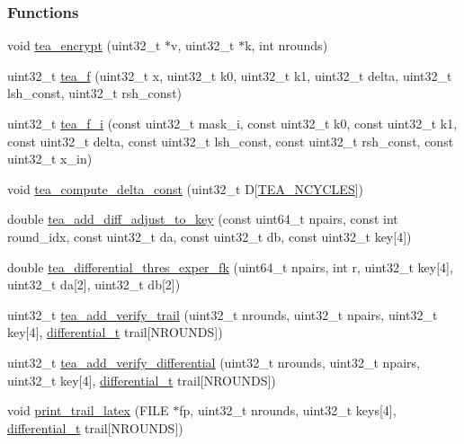 \subsubsection*{\-Functions}
\begin{DoxyCompactItemize}
\item 
void \hyperlink{tea_8hh_a40525ecf9356be561e0c340bf5733ad2}{tea\-\_\-encrypt} (uint32\-\_\-t $\ast$v, uint32\-\_\-t $\ast$k, int nrounds)
\item 
uint32\-\_\-t \hyperlink{tea_8hh_ac48211a6f68e2f7a77996cbb3f08fa65}{tea\-\_\-f} (uint32\-\_\-t x, uint32\-\_\-t k0, uint32\-\_\-t k1, uint32\-\_\-t delta, uint32\-\_\-t lsh\-\_\-const, uint32\-\_\-t rsh\-\_\-const)
\item 
uint32\-\_\-t \hyperlink{tea_8hh_a954e4605d99d98c4f62787b1b6efa9a6}{tea\-\_\-f\-\_\-i} (const uint32\-\_\-t mask\-\_\-i, const uint32\-\_\-t k0, const uint32\-\_\-t k1, const uint32\-\_\-t delta, const uint32\-\_\-t lsh\-\_\-const, const uint32\-\_\-t rsh\-\_\-const, const uint32\-\_\-t x\-\_\-in)
\item 
void \hyperlink{tea_8hh_ab306a4cede2b1c148d48c87ee024252c}{tea\-\_\-compute\-\_\-delta\-\_\-const} (uint32\-\_\-t \-D\mbox{[}\hyperlink{tea_8hh_a731ff0e924a27e36c0f7bc72a7d383c5}{\-T\-E\-A\-\_\-\-N\-C\-Y\-C\-L\-E\-S}\mbox{]})
\item 
double \hyperlink{tea_8hh_a017d938e2967f497987d4a77000b043a}{tea\-\_\-add\-\_\-diff\-\_\-adjust\-\_\-to\-\_\-key} (const uint64\-\_\-t npairs, const int round\-\_\-idx, const uint32\-\_\-t da, const uint32\-\_\-t db, const uint32\-\_\-t key\mbox{[}4\mbox{]})
\item 
double \hyperlink{tea_8hh_aadbe72956ed93bb2093fbd10e967f1a6}{tea\-\_\-differential\-\_\-thres\-\_\-exper\-\_\-fk} (uint64\-\_\-t npairs, int r, uint32\-\_\-t key\mbox{[}4\mbox{]}, uint32\-\_\-t da\mbox{[}2\mbox{]}, uint32\-\_\-t db\mbox{[}2\mbox{]})
\item 
uint32\-\_\-t \hyperlink{tea_8hh_aad728904852ace44041654d3b06c8288}{tea\-\_\-add\-\_\-verify\-\_\-trail} (uint32\-\_\-t nrounds, uint32\-\_\-t npairs, uint32\-\_\-t key\mbox{[}4\mbox{]}, \hyperlink{structdifferential__t}{differential\-\_\-t} trail\mbox{[}\-N\-R\-O\-U\-N\-D\-S\mbox{]})
\item 
uint32\-\_\-t \hyperlink{tea_8hh_a47790679b78464d5ee2d0d6dc7d579bc}{tea\-\_\-add\-\_\-verify\-\_\-differential} (uint32\-\_\-t nrounds, uint32\-\_\-t npairs, uint32\-\_\-t key\mbox{[}4\mbox{]}, \hyperlink{structdifferential__t}{differential\-\_\-t} trail\mbox{[}\-N\-R\-O\-U\-N\-D\-S\mbox{]})
\item 
void \hyperlink{tea_8hh_a8d1af56a9274681157258b784791bd06}{print\-\_\-trail\-\_\-latex} (\-F\-I\-L\-E $\ast$fp, uint32\-\_\-t nrounds, uint32\-\_\-t keys\mbox{[}4\mbox{]}, \hyperlink{structdifferential__t}{differential\-\_\-t} trail\mbox{[}\-N\-R\-O\-U\-N\-D\-S\mbox{]})
\end{DoxyCompactItemize}


